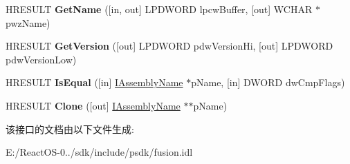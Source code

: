 \begin{DoxyCompactItemize}
H\+R\+E\+S\+U\+LT {\bfseries Get\+Name} (\mbox{[}in, out\mbox{]} L\+P\+D\+W\+O\+RD lpcw\+Buffer, \mbox{[}out\mbox{]} W\+C\+H\+AR $\ast$pwz\+Name)
\item 
\mbox{\label{interface_i_assembly_name_a688cccf730d42b9ea420a522abf23efd}} 
H\+R\+E\+S\+U\+LT {\bfseries Get\+Version} (\mbox{[}out\mbox{]} L\+P\+D\+W\+O\+RD pdw\+Version\+Hi, \mbox{[}out\mbox{]} L\+P\+D\+W\+O\+RD pdw\+Version\+Low)
\item 
\mbox{\label{interface_i_assembly_name_a1e5a72f86e5619fc1940ded7a85e6526}} 
H\+R\+E\+S\+U\+LT {\bfseries Is\+Equal} (\mbox{[}in\mbox{]} \hyperlink{interface_i_assembly_name}{I\+Assembly\+Name} $\ast$p\+Name, \mbox{[}in\mbox{]} D\+W\+O\+RD dw\+Cmp\+Flags)
\item 
\mbox{\label{interface_i_assembly_name_a4b25ba21a5dc2d44788e54dbf0485d90}} 
H\+R\+E\+S\+U\+LT {\bfseries Clone} (\mbox{[}out\mbox{]} \hyperlink{interface_i_assembly_name}{I\+Assembly\+Name} $\ast$$\ast$p\+Name)
\end{DoxyCompactItemize}


该接口的文档由以下文件生成\+:\begin{DoxyCompactItemize}
\item 
E\+:/\+React\+O\+S-\/0../sdk/include/psdk/fusion.\+idl\end{DoxyCompactItemize}
